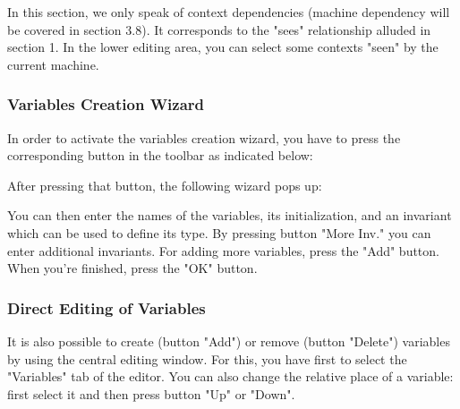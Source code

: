 In this section, we only speak of context dependencies (machine dependency will be covered in section 3.8). It corresponds to the "sees" relationship alluded in section 1. In the lower editing area, you can select some contexts "seen" by the current machine. 

\subsubsection{Variables Creation Wizard}

In order to activate the variables creation wizard, you have to press the corresponding button in the toolbar as indicated below: 


After pressing that button, the following wizard pops up: 


You can then enter the names of the variables, its initialization, and an invariant which can be used to define its type. By pressing button "More Inv." you can enter additional invariants. For adding more variables, press the "Add" button. When you’re finished, press the "OK" button. 

\subsubsection{Direct Editing of Variables}

It is also possible to create (button "Add") or remove (button "Delete") variables by using the central editing window. For this, you have first to select the "Variables" tab of the editor. You can also change the relative place of a variable: first select it and then press button "Up" or "Down". 


